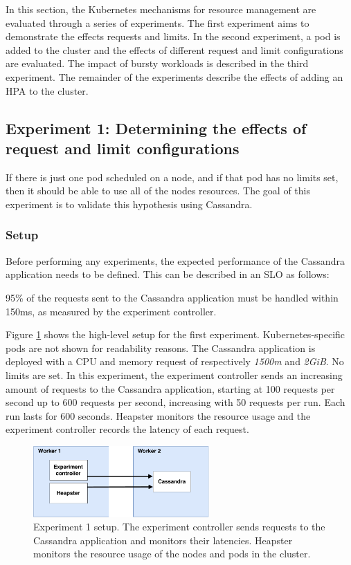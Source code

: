 In this section, the Kubernetes mechanisms for resource management are evaluated through a series of experiments. The first experiment aims to demonstrate the effects requests and limits. In the second experiment, a pod is added to the cluster and the effects of different request and limit configurations are evaluated. The impact of bursty workloads is described in the third experiment. The remainder of the experiments describe the effects of adding an HPA to the cluster.


\subsection{Experiment 1: Determining the effects of request and limit configurations}
If there is just one pod scheduled on a node, and if that pod has no limits set, then it should be able to use all of the nodes resources. The goal of this experiment is to validate this hypothesis using Cassandra.

\subsubsection{Setup}
Before performing any experiments, the expected performance of the Cassandra application needs to be defined. This can be described in an SLO as follows:

\begin{slo}
95\% of the requests sent to the Cassandra application must be handled within 150ms, as measured by the experiment controller.
\end{slo}

Figure \ref{fig:experiment1} shows the high-level setup for the first experiment. Kubernetes-specific pods are not shown for readability reasons. The Cassandra application is deployed with a CPU and memory request of respectively \textit{1500m} and \textit{2GiB}. No limits are set. In this experiment, the experiment controller sends an increasing amount of requests to the Cassandra application, starting at 100 requests per second up to 600 requests per second, increasing with 50 requests per run. Each run lasts for 600 seconds. Heapster monitors the resource usage and the experiment controller records the latency of each request.

\setlength\abovecaptionskip{3pt}
\begin{figure}[H]
\centering
\includegraphics[width=0.60\textwidth]{Images/Experiments/Experiment_1.pdf}
\caption{Experiment 1 setup. The experiment controller sends requests to the Cassandra application and monitors their latencies. Heapster monitors the resource usage of the nodes and pods in the cluster.}
\label{fig:experiment1} 
\end{figure}

